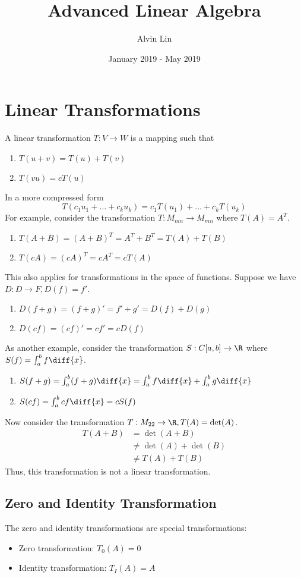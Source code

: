 \documentclass{math}
\title{Advanced Linear Algebra}
\author{Alvin Lin}
\date{January 2019 - May 2019}
\begin{document}
\maketitle

\section*{Linear Transformations}
A linear transformation \( T:V\to W \) is a mapping such that
\begin{enumerate}
  \item \( T(u+v) = T(u)+T(v) \)
  \item \( T(vu) = cT(u) \)
\end{enumerate}
In a more compressed form
\[ T(c_1u_1+\dots+c_ku_k) = c_1T(u_1)+\dots+c_kT(u_k) \]
For example, consider the transformation \( T:M_{mn}\to M_{mn} \)
where \( T(A) = A^T \).
\begin{enumerate}
  \item \( T(A+B) = (A+B)^T = A^T+B^T = T(A)+T(B) \)
  \item \( T(cA) = (cA)^T = cA^T = cT(A) \)
\end{enumerate}
This also applies for transformations in the space of functions. Suppose we have
\( D:D\to F, D(f) = f' \).
\begin{enumerate}
  \item \( D(f+g) = (f+g)' = f'+g' = D(f)+D(g) \)
  \item \( D(cf) = (cf)' = cf' = cD(f) \)
\end{enumerate}
As another example, consider the transformation \( S:C[a,b]\to\R \) where
\( S(f) = \int_{a}^{b}f\diff{x} \).
\begin{enumerate}
  \item \( S(f+g) = \int_{a}^{b}(f+g)\diff{x} =
    \int_{a}^{b}f\diff{x}+\int_{a}^{b}g\diff{x} \)
  \item \( S(cf) = \int_{a}^{b}cf\diff{x} = cS(f) \)
\end{enumerate}
Now consider the transformation \( T:M_{22}\to\R, T(A) = \det(A) \).
\begin{align*}
  T(A+B) &= \det(A+B) \\
  &\ne \det(A)+\det(B) \\
  &\ne T(A)+T(B)
\end{align*}
Thus, this transformation is not a linear transformation.

\subsection*{Zero and Identity Transformation}
The zero and identity transformations are special transformations:
\begin{itemize}
  \item Zero transformation: \( T_0(A) = 0 \)
  \item Identity transformation: \( T_I(A) = A \)
\end{itemize}
\end{document}
